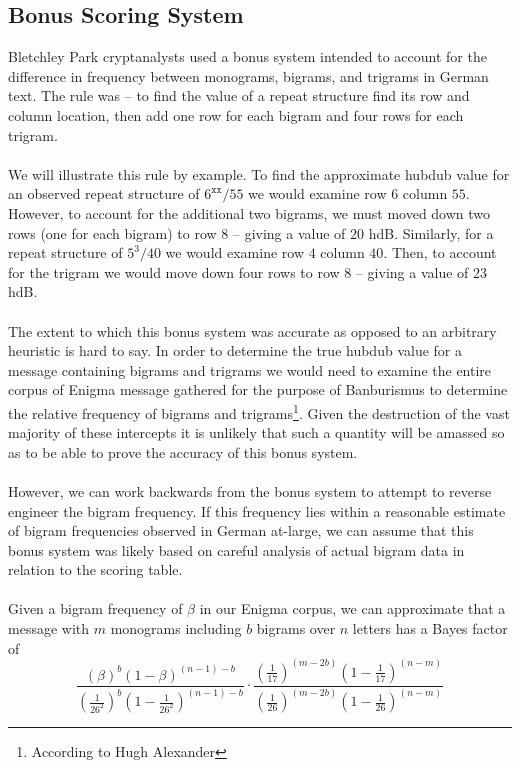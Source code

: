 \subsection{Bonus Scoring System} Bletchley Park cryptanalysts used
a bonus system intended to account for the difference in frequency
between monograms, bigrams, and trigrams in German text. The rule
was -- to find the value of a repeat structure find its row and
column location, then add one row for each bigram and four rows for
each trigram. \\\\We will illustrate this rule by example. To find
the approximate hubdub value for an observed repeat structure of
$6^\texttt{xx}/55$ we would examine row $6$ column $55$. However,
to account for the additional two bigrams, we must moved down two
rows (one for each bigram) to row $8$ -- giving a value of $20$
hdB. Similarly, for a repeat structure of $5^3/40$ we would examine
row $4$ column $40$. Then, to account for the trigram we would move
down four rows to row $8$ -- giving a value of $23$ hdB.
\\\\The extent to which this bonus system was accurate as opposed
to an arbitrary heuristic is hard to say. In order to determine the
true hubdub value for a message containing bigrams and trigrams we
would need to examine the entire corpus of Enigma message gathered
for the purpose of Banburismus to determine the relative frequency
of bigrams and trigrams\footnote{According to Hugh Alexander}.
Given the destruction of the vast majority of these intercepts it
is unlikely that such a quantity will be amassed so as to be able
to prove the accuracy of this bonus system.
\\\\However, we can work backwards from the bonus system to attempt
to reverse engineer the bigram frequency. If this frequency lies
within a reasonable estimate of bigram frequencies observed in
German at-large, we can assume that this bonus system was likely
based on careful analysis of actual bigram data in relation to the
scoring table.
\\\\Given a bigram frequency of $\beta$ in our Enigma corpus, we
can approximate that a message with $m$ monograms including $b$
bigrams over $n$ letters has a Bayes factor of
\[
	\frac{(\beta)^b(1-\beta)^{(n-1)-b}}{(\frac{1}{26^2})^b(1-\frac{1}{26^2})^{(n-1)-b}}\cdot\frac{(\frac{1}{17})^{(m-2b)}(1-\frac{1}{17})^{(n-m)}}{(\frac{1}{26})^{(m-2b)}(1-\frac{1}{26})^{(n-m)}}
\]
